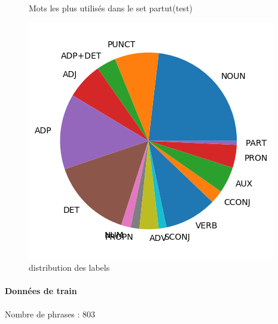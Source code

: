 \begin{figure}[H]
\begin{minipage}{0.48\textwidth}
\begin{tabular}{|l || *{11 }{|c} |}
\end{tabular}
\caption{ Mots les plus utilisés dans le set partut(test) } \label{Fig:muw}\end{minipage} 
\begin{minipage}{0.48\textwidth} \centering
\includegraphics[width=.7\linewidth]{partuttest_img.png}
\caption{distribution des labels}
\end{minipage}
\end{figure} \paragraph{Données de train \\ }  
 Nombre de phrases : 803\\ 
